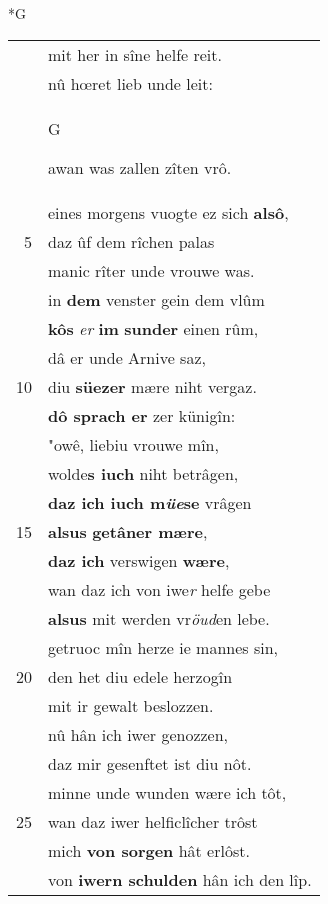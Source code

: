 \documentclass[8pt,a4paper,notitlepage]{article}
\begin{document}
\begin{table}[ht]
\begin{minipage}[t]{0.5\linewidth}
\small
\begin{center}*G
\end{center}
\begin{tabular}{rl}
 & mit her in sîne helfe reit.\\ 
 & nû hœret lieb unde leit:\\ 
 & \begin{large}G\end{large}awan was zallen zîten vrô.\\ 
 & eines morgens vuogte ez sich \textbf{alsô},\\ 
5 & daz ûf dem rîchen palas\\ 
 & manic rîter unde vrouwe was.\\ 
 & in \textbf{dem} venster gein dem vlûm\\ 
 & \textbf{kôs} \textit{er} \textbf{im} \textbf{sunder} einen rûm,\\ 
 & dâ er unde Arnive saz,\\ 
10 & diu \textbf{süezer} mære niht vergaz.\\ 
 & \textbf{dô sprach er} zer künigîn:\\ 
 & "owê, liebiu vrouwe mîn,\\ 
 & wolde\textbf{s iuch} niht betrâgen,\\ 
 & \textbf{daz ich iuch m\textit{üe}se} vrâgen\\ 
15 & \textbf{alsus} \textbf{getâner mære},\\ 
 & \textbf{daz ich} verswigen \textbf{wære},\\ 
 & wan daz ich von iwe\textit{r} helfe gebe\\ 
 & \textbf{alsus} mit werden vr\textit{öud}en lebe.\\ 
 & getruoc mîn herze ie mannes sin,\\ 
20 & den het diu edele herzogîn\\ 
 & mit ir gewalt beslozzen.\\ 
 & nû hân ich iwer genozzen,\\ 
 & daz mir gesenftet ist diu nôt.\\ 
 & minne unde wunden wære ich tôt,\\ 
25 & wan daz iwer helficlîcher trôst\\ 
 & mich \textbf{von sorgen} hât erlôst.\\ 
 & von \textbf{iwern schulden} hân ich den lîp.\\ 

\end{tabular}
\end{minipage}
\end{table}
\end{document}
